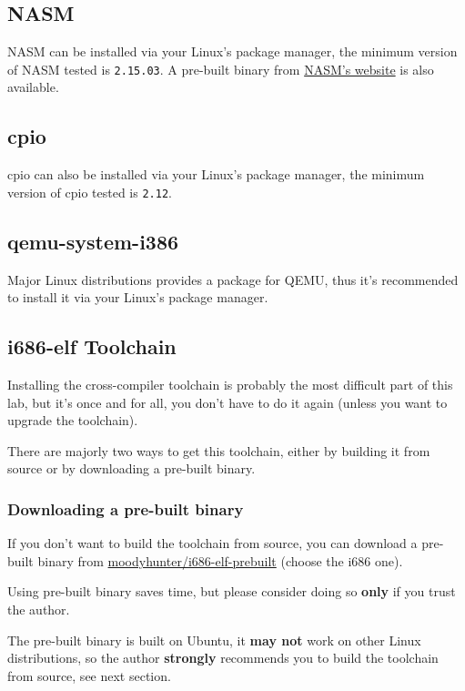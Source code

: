 \subsection{NASM} \label{sec:nasm-install}

NASM can be installed via your Linux's package manager, the minimum version of NASM tested is
\texttt{2.15.03}. A pre-built binary from \href{https://www.nasm.us}{NASM's website} is also
available.

\subsection{cpio} \label{sec:cpio-install}

cpio can also be installed via your Linux's package manager, the minimum version of cpio
tested is \texttt{2.12}.

\subsection{qemu-system-i386} \label{sec:qemu-install}

Major Linux distributions provides a package for QEMU, thus it's recommended to install it via
your Linux's package manager.

\subsection{i686-elf Toolchain} \label{sec:cross-compiler-install}

Installing the cross-compiler toolchain is probably the most difficult part of this lab,
but it's once and for all, you don't have to do it again (unless you want to upgrade the
toolchain).

There are majorly two ways to get this toolchain, either by building it from source or by
downloading a pre-built binary.

\subsubsection{Downloading a pre-built binary}

If you don't want to build the toolchain from source, you can download a pre-built
binary from
\href{https://github.com/moodyhunter/i686-elf-prebuilt/releases}{moodyhunter/i686-elf-prebuilt}
(choose the i686 one).

\begin{warning}
    \item Using pre-built binary saves time, but please consider doing so \textbf{only} if you
    trust the author.
    \item The pre-built binary is built on Ubuntu, it \textbf{may not} work on other Linux
    distributions, so the author \textbf{strongly} recommends you to build the toolchain from
    source, see next section.
\end{warning}

